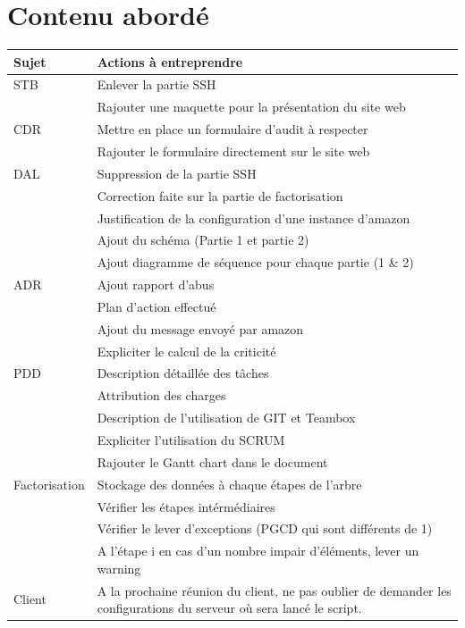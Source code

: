 \documentclass[a4paper,11pt,french]{article}
\begin{document}
\section{Contenu abordé}
\begin{center}

\begin{tabular}{ | l | p{15cm} |}
	\hline
   \textbf{Sujet} & \textbf{Actions à entreprendre}    \\ \hline
 STB & Enlever la partie SSH \\ 
 & Rajouter une maquette pour la présentation du site web \\ \hline
CDR &  Mettre en place un formulaire d'audit à respecter \\
&  Rajouter le formulaire directement sur le site web \\ \hline
DAL & Suppression de la partie SSH\\
	& Correction faite sur la partie de factorisation \\
	& Justification de la configuration d'une instance d'amazon\\
	&  Ajout du schéma (Partie 1 et partie 2) \\
	&  Ajout diagramme de séquence pour chaque partie (1 \& 2) \\ \hline
ADR	& Ajout rapport d'abus\\
&  Plan d'action effectué \\
&  Ajout du message envoyé par amazon  \\
&  Expliciter le calcul de la criticité \\ \hline
PDD & Description détaillée des tâches\\
 & Attribution des charges\\
 & Description de l'utilisation de GIT et Teambox \\
 & Expliciter l'utilisation du SCRUM \\
 & Rajouter le Gantt chart dans le document\\ \hline
Factorisation& Stockage des données à chaque étapes de l'arbre\\
 & Vérifier les étapes intérmédiaires\\
 & Vérifier le lever d'exceptions (PGCD qui sont différents de 1) \\
 & A l'étape i en cas d'un nombre impair d'éléments, lever un warning\\ \hline
 Client & A la prochaine réunion du client, ne pas oublier de demander les configurations du serveur où sera lancé le script.
\\ \hline
 \end{tabular}
 
\end{center}
\end{document}
